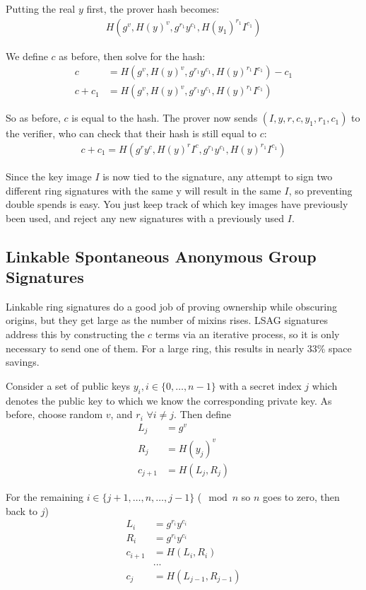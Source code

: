 \documentclass{article}
\begin{document}
Putting the real $y$ first, the prover hash becomes:
\begin{align}
  H(g^v, H(y)^v, g^{r_1} y^{c_1}, H(y_1)^{r_1} I^{c_1})
\end{align}

We define $c$ as before, then solve for the hash:
\begin{align}
  c &= H(g^v, H(y)^v, g^{r_1} y^{c_1}, H(y)^{r_1} I^{c_1}) - c_1\\
  c + c_1 &= H(g^v, H(y)^v, g^{r_1} y^{c_1}, H(y)^{r_1} I^{c_1})
\end{align}

So as before, $c$ is equal to the hash.  The prover now sends $(I, y, r, c, y_1, r_1, c_1)$ to the verifier, who can check that their hash is still equal to $c$:
\begin{align}
  c + c_1 = H(g^r y^c, H(y)^r I^c, g^{r_1} y^{c_1}, H(y)^{r_1} I^{c_1})
\end{align}

Since the key image $I$ is now tied to the signature, any attempt to sign two different ring signatures with the same y will result in the same $I$, so preventing double spends is easy.  You just keep track of which key images have previously been used, and reject any new signatures with a previously used $I$.


\subsection{Linkable Spontaneous Anonymous Group Signatures}

Linkable ring signatures do a good job of proving ownership while obscuring origins, but they get large as the number of mixins rises. LSAG signatures address this by constructing the $c$ terms via an iterative process, so it is only necessary to send one of them.  For a large ring, this results in nearly 33\% space savings.

Consider a set of public keys $y_i, i \in \{0, …, n-1\}$ with a secret index $j$ which denotes the public key to which we know the corresponding private key.  As before, choose random $v$, and $r_i$ $\forall i \ne j$.  Then define
\begin{align}
      L_j &= g^v\\
      R_j &= H(y_j)^v\\
  c_{j+1} &= H(L_j,R_j)
\end{align}

For the remaining $i \in \{j+1, …, n, …, j-1\}$ ($\mod{n}$ so $n$ goes to zero, then back to $j$)
\begin{align}
  L_i &= g^{r_i} y^{c_i}\\
  R_i &= g^{r_i} y^{c_i}\\
  c_{i+1} &= H(L_i,R_i)\\
  &... \\
  c_j &= H(L_{j-1}, R_{j-1})
\end{align}
\end{document}
